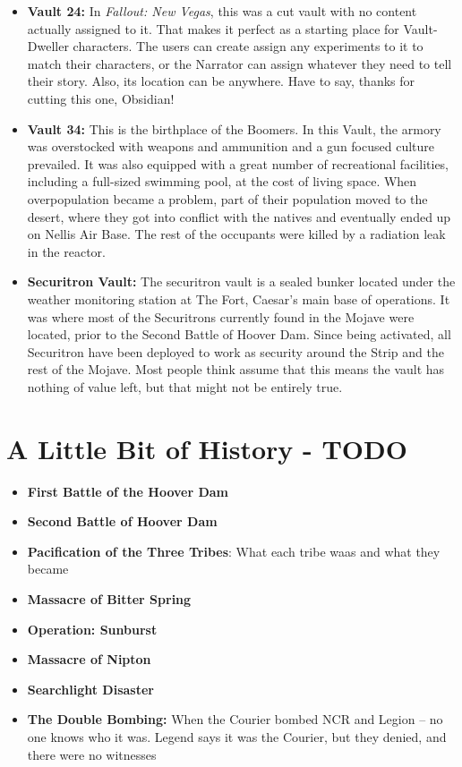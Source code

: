 \documentclass[11pt]{article} %
\begin{document}
\begin{itemize}
	\item \textbf{Vault 24:} In \textit{Fallout: New Vegas}, this was a cut vault with no content actually assigned to it. That makes it perfect as a starting place for Vault-Dweller characters. The users can create assign any experiments to it to match their characters, or the Narrator can assign whatever they need to tell their story. Also, its location can be anywhere. Have to say, thanks for cutting this one, Obsidian!
	
	\item \textbf{Vault 34:} This is the birthplace of the Boomers. In this Vault, the armory was overstocked with weapons and ammunition and a gun focused culture prevailed. It was also equipped with a great number of recreational facilities, including a full-sized swimming pool, at the cost of living space. When overpopulation became a problem, part of their population moved to the desert, where they got into conflict with the natives and eventually ended up on Nellis Air Base. The rest of the occupants were killed by a radiation leak in the reactor.
	
	\item \textbf{Securitron Vault:} The securitron vault is a sealed bunker located under the weather monitoring station at The Fort, Caesar's main base of operations. It was where most of the Securitrons currently found in the Mojave were located, prior to the Second Battle of Hoover Dam. Since being activated, all Securitron have been deployed to work as security around the Strip and the rest of the Mojave. Most people think assume that this means the vault has nothing of value left, but that might not be entirely true.
\end{itemize}


\section{A Little Bit of History - TODO}

\begin{itemize}
	\item \textbf{First Battle of the Hoover Dam}
	
	\item \textbf{Second Battle of Hoover Dam}
	
	\item \textbf{Pacification of the Three Tribes}: What each tribe waas and what they became
	
	\item \textbf{Massacre of Bitter Spring}
	
	\item \textbf{Operation: Sunburst}
	
	\item \textbf{Massacre of Nipton}
	
	\item \textbf{Searchlight Disaster}
	
	\item \textbf{The Double Bombing:} When the Courier bombed NCR and Legion -- no one knows who it was. Legend says it was the Courier, but they denied, and there were no witnesses
\end{itemize}
\end{document}
